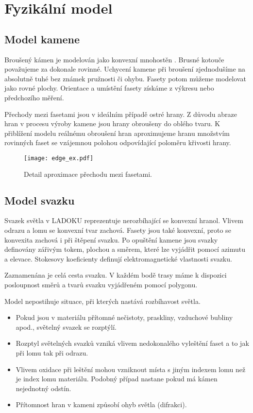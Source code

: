 \chapter{Fyzikální model}

\section{Model kamene}
Broušený kámen je modelován jako konvexní mnohostěn \cite{Pohl2002}. Brusné kotouče považujeme za dokonale rovinné. Uchycení kamene při broušení zjednodušíme na absolutně tuhé bez známek pružnosti či ohybu. Fasety potom můžeme modelovat jako rovné plochy. Orientace a umístění fasety získáme z výkresu nebo předchozího měření. 

Přechody mezi fasetami jsou v ideálním případě ostré hrany. Z důvodu abraze hran v procesu výroby kamene jsou hrany obroušeny do oblého tvaru. K přiblížení modelu reálnému obroušení hran aproximujeme hranu množstvím rovinných faset se vzájemnou polohou odpovídající poloměru křivosti hrany.  
  
\begin{figure}[htps]
\centering
\texttt{[image: edge\_ex.pdf]}
\caption{Detail aproximace přechodu mezi fasetami.}
\label{fig: edge}
\end{figure}  

\section{Model svazku}
Svazek světla v LADOKU reprezentuje nerozbíhající se konvexní hranol. Vlivem odrazu a lomu se konvexní tvar zachová. Fasety jsou také konvexní, proto se konvexita zachová i při štěpení svazku. Po opuštění kamene jsou svazky definovány zářivým tokem, plochou a směrem, které lze vyjádřit pomocí azimutu a elevace. Stokesovy koeficienty definují elektromagnetické vlastnosti svazku. 

Zaznamenána je celá cesta svazku. V každém bodě trasy máme k dispozici posloupnost směrů a tvarů svazku vyjádřeném pomocí polygonu. 

Model nepostihuje situace, při kterých nastává rozbíhavost světla.
\begin{itemize}
\item Pokud jsou v materiálu přítomné nečistoty, praskliny, vzduchové bubliny apod., světelný svazek se rozptýlí.
\item  Rozptyl světelných svazků vzniká vlivem nedokonalého vyleštění faset a to jak při lomu tak při odrazu.
\item Vlivem oxidace při leštění mohou vzniknout místa s jiným indexem lomu než je index lomu materiálu. Podobný případ nastane pokud má kámen nejednotný odstín.

\item Přítomnost hran v kameni způsobí ohyb světla (difrakci).
\end{itemize}

